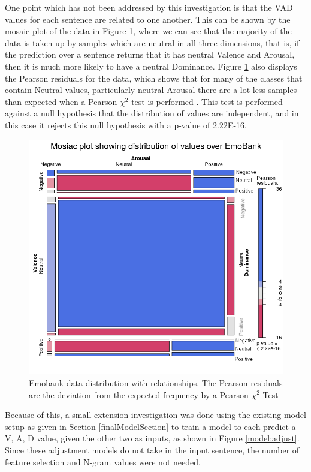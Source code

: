 One point which has not been addressed by this investigation is that the VAD values for each sentence are related to one another. This can be shown by the mosaic plot of the data in Figure \ref{mosaic:emo}, where we can see that the majority of the data is taken up by samples which are neutral in all three dimensions, that is, if the prediction over a sentence returns that it has neutral Valence and Arousal, then it is much more likely to have a neutral Dominance. Figure \ref{mosaic:emo} also displays the Pearson residuals for the data, which shows that for many of the classes that contain Neutral values, particularly neutral Arousal there are a lot less samples than expected when a Pearson $\chi^2$ test is performed \cite{zeileis2007residual}. This test is performed against a null hypothesis that the distribution of values are independent, and in this case it rejects this null hypothesis with a p-value of 2.22E-16.
\begin{figure}[ht]
\centering
\includegraphics[scale=0.7]{graphs/mosaic_new.png}
\caption{Emobank data distribution with relationships. The Pearson residuals are the deviation from the expected frequency by a Pearson $\chi^2$ Test \cite{pearson1900x}}
\label{mosaic:emo}
\end{figure}

Because of this, a small extension investigation was done using the existing model setup as given in Section \ref{finalModelSection} to train a model to each predict a V, A, D value, given the other two as inputs, as shown in Figure \ref{model:adjust}. Since these adjustment models do not take in the input sentence, the number of feature selection and N-gram values were not needed.

